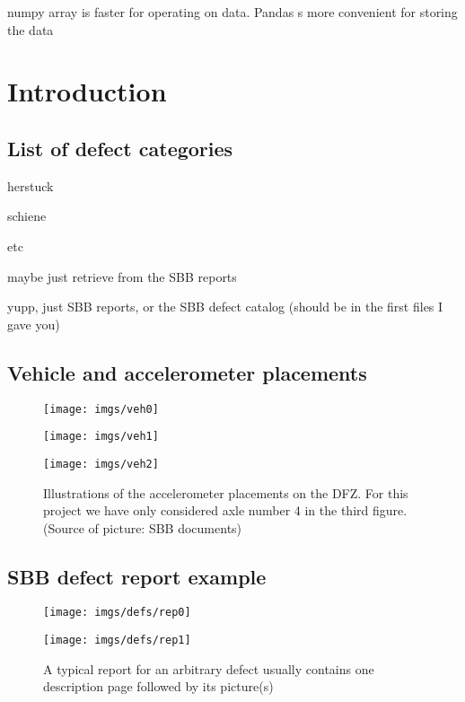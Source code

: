 numpy array is faster for operating on data.
Pandas s more convenient for storing the data




\newpage
\cleardoublepage
\appendix
\chapter{Introduction}
\section{List of defect categories}
herstuck 

schiene

etc

maybe just retrieve from the SBB reports

yupp, just SBB reports, or the SBB defect catalog (should be in the first files I gave you)

\section{Vehicle and accelerometer placements}
\label{figs:veh}
\begin{figure}[H]
	\centering
	\texttt{[image: imgs/veh0]}
	\label{fig:veh0}
	
	\texttt{[image: imgs/veh1]}
	\label{fig:veh1}
	
	\texttt{[image: imgs/veh2]}
	\caption{Illustrations of the accelerometer placements on the DFZ. For this project we have only considered axle number 4 in the third figure. (Source of picture: SBB documents)}
	\label{fig:veh2}
\end{figure}

\section{SBB defect report example}
\label{app:report}
\begin{figure}[H]
	\centering
	\texttt{[image: imgs/defs/rep0]}
	\caption{}
	\texttt{[image: imgs/defs/rep1]}
	\caption{A typical report for an arbitrary defect usually contains one description page followed by its picture(s)}
	\label{fig:veh2}
\end{figure}


